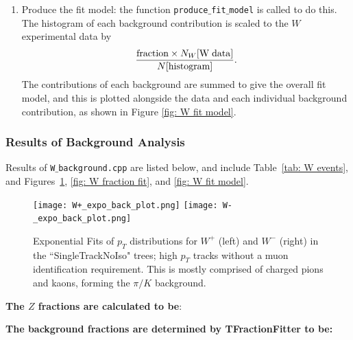 \documentclass[a4paper]{article}
\begin{document}
\begin{enumerate}
    \item Produce the fit model: the function \texttt{produce$\_$fit$\_$model} is called to do this. The histogram of each background contribution is scaled to the $W$ experimental data by
    \begin{equation}
        \frac{{\rm fraction} \times N_W[{\rm W \; data}]}{N[{\rm histogram}]}.
    \end{equation}
    The contributions of each background are summed to give the overall fit model, and this is plotted alongside the data and each individual background contribution, as shown in Figure \ref{fig: W fit model}.
\end{enumerate}




\subsubsection{Results of Background Analysis} \label{sec: W background results}
Results of \texttt{W$\_$background.cpp} are listed below, and include Table~\ref{tab: W events}, and Figures~\ref{fig: W exp back fit}, \ref{fig: W fraction fit}, and \ref{fig: W fit model}.

\begin{figure}[h]
  \centering
  \texttt{[image: W+\_expo\_back\_plot.png]}
  \texttt{[image: W-\_expo\_back\_plot.png]} \hspace{3mm}
  \vspace{-4mm}
  \caption{\small Exponential Fits of $p_T$ distributions for $W^+$ (left) and $W^-$ (right) in the ``SingleTrackNoIso" trees; high $p_T$ tracks without a muon identification requirement. This is mostly comprised of charged pions and kaons, forming the $\pi/K$ background.}
  \label{fig: W exp back fit}
\end{figure}



\textbf{The $Z$ fractions are calculated to be}: \newline



\textbf{The background fractions are determined by TFractionFitter to be:} \newline

\newline

\end{document}
